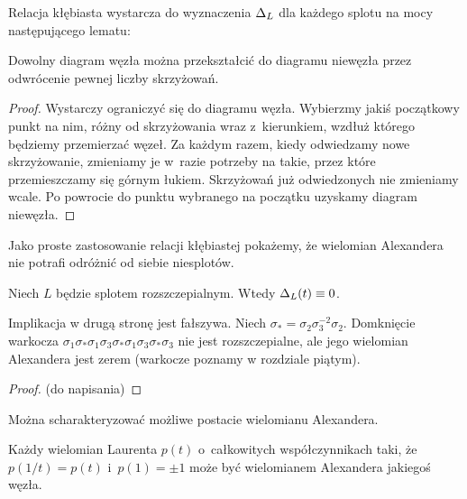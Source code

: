 Relacja kłębiasta wystarcza do wyznaczenia $\Delta_L$ dla każdego splotu na mocy następującego lematu:

\begin{lemma}
    \label{lem:gordian_number}
    Dowolny diagram węzła można przekształcić do diagramu niewęzła przez odwrócenie pewnej liczby skrzyżowań.
\end{lemma}

\begin{proof}
    Wystarczy ograniczyć się do diagramu węzła.
    Wybierzmy jakiś początkowy punkt na nim, różny od skrzyżowania wraz z~kierunkiem, wzdłuż którego będziemy przemierzać węzeł.
    Za każdym razem, kiedy odwiedzamy nowe skrzyżowanie, zmieniamy je w~razie potrzeby na takie, przez które przemieszczamy się górnym łukiem.
    Skrzyżowań już odwiedzonych nie zmieniamy wcale. Po powrocie do punktu wybranego na początku uzyskamy diagram niewęzła.
\end{proof}

Jako proste zastosowanie relacji kłębiastej pokażemy, że wielomian Alexandera nie potrafi odróżnić od siebie niesplotów.

\begin{proposition}
    \label{prp:alexander_unlinks}
    Niech $L$ będzie splotem rozszczepialnym.
    Wtedy $\Delta_L(t) \equiv 0$.
\end{proposition}

Implikacja w drugą stronę jest fałszywa.
Niech $\sigma_* = \sigma_{2} \sigma_{3}^{-2} \sigma_{2}$.
Domknięcie warkocza $\sigma_{1} \sigma_* \sigma_{1} \sigma_{3} \sigma_* \sigma_{1} \sigma_{3} \sigma_* \sigma_{3}$ nie jest rozszczepialne, ale jego wielomian Alexandera jest zerem (warkocze poznamy w rozdziale piątym).

\begin{proof}
    (do napisania)
\end{proof}


Można scharakteryzować możliwe postacie wielomianu Alexandera.

\begin{proposition}[Hosokowa, 1958]
    Każdy wielomian Laurenta $p(t)$ o~całkowitych współczynnikach taki, że $p(1/t) = p(t)$ i~$p(1) = \pm 1$ może być wielomianem Alexandera jakiegoś węzła.
\end{proposition}

